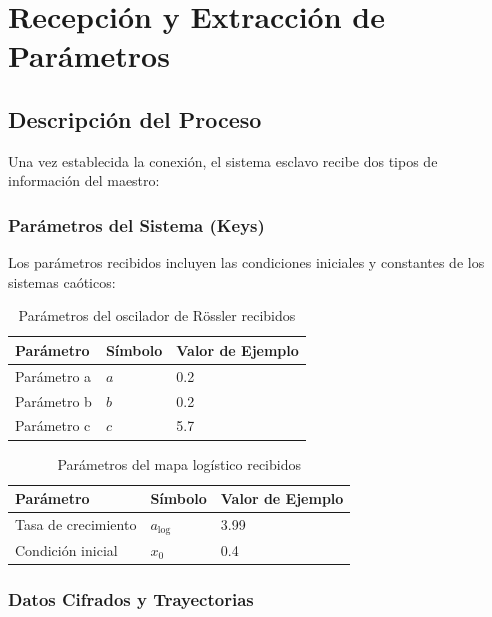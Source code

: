 \documentclass[12pt,a4paper]{article}
\begin{document}
	\section{Recepción y Extracción de Parámetros}
	
	\subsection{Descripción del Proceso}
	
	Una vez establecida la conexión, el sistema esclavo recibe dos tipos de información del maestro:
	
	\subsubsection{Parámetros del Sistema (Keys)}
	
	Los parámetros recibidos incluyen las condiciones iniciales y constantes de los sistemas caóticos:
	
	\begin{table}[H]
		\centering
		\caption{Parámetros del oscilador de Rössler recibidos}
		\label{tab:rossler_params}
		\begin{tabular}{@{}lll@{}}
			\toprule
			\textbf{Parámetro} & \textbf{Símbolo} & \textbf{Valor de Ejemplo} \\ \midrule
			Parámetro a & $a$ & 0.2 \\
			Parámetro b & $b$ & 0.2 \\
			Parámetro c & $c$ & 5.7 \\ \bottomrule
		\end{tabular}
	\end{table}
	
	\begin{table}[H]
		\centering
		\caption{Parámetros del mapa logístico recibidos}
		\label{tab:logistic_params}
		\begin{tabular}{@{}lll@{}}
			\toprule
			\textbf{Parámetro} & \textbf{Símbolo} & \textbf{Valor de Ejemplo} \\ \midrule
			Tasa de crecimiento & $a_{\text{log}}$ & 3.99 \\
			Condición inicial & $x_0$ & 0.4 \\ \bottomrule
		\end{tabular}
	\end{table}
	
	\subsubsection{Datos Cifrados y Trayectorias}
	
\end{document}
